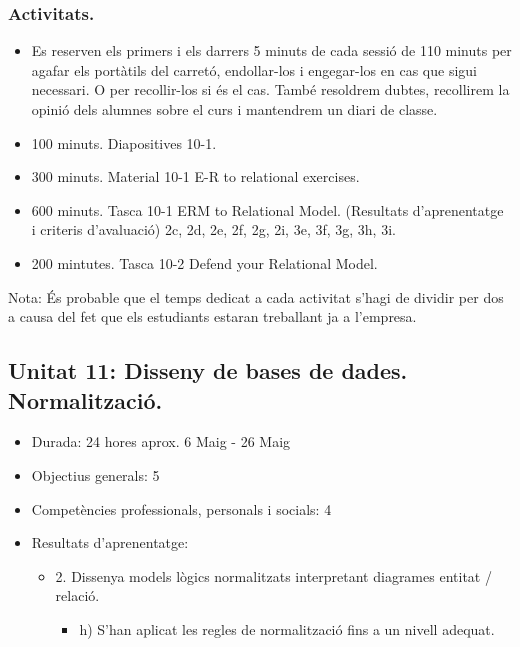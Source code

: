 \documentclass[catalan, a4paper, 12pt, titlepage]{article}
\begin{document}
  \subsubsection{Activitats.}
  \begin{itemize}
          \item Es reserven els primers i els darrers 5 minuts de cada sessió de 110 minuts per agafar els portàtils del carretó, endollar-los i engegar-los en cas que sigui necessari. O per recollir-los si és el cas. També resoldrem dubtes, recollirem la opinió dels alumnes sobre el curs i mantendrem un diari de classe.
	  \item 100 minuts. Diapositives 10-1.
	  \item 300 minuts. Material 10-1 E-R to relational exercises.
	  \item 600 minuts. Tasca 10-1 ERM to Relational Model. (\faGraduationCap Resultats d'aprenentatge i criteris d'avaluació) 2c, 2d, 2e, 2f, 2g, 2i, 3e, 3f, 3g, 3h, 3i.
	  \item 200 mintutes. Tasca 10-2 Defend your Relational Model.
  \end{itemize}

  Nota: És probable que el temps dedicat a cada activitat s'hagi de dividir per dos a causa del fet que els estudiants estaran treballant ja a l'empresa.

  \subsection{Unitat 11: Disseny de bases de dades. Normalització.}

  \begin{itemize}
	\item Durada: 24 hores aprox. 6 Maig - 26 Maig
	\item Objectius generals: 5
	\item Competències professionals, personals i socials: 4
	\item Resultats d'aprenentatge: 
		\begin{itemize}
			\item 2. Dissenya models lògics normalitzats interpretant diagrames entitat / relació.
				\begin{itemize}
					\item h) S'han aplicat les regles de normalització fins a un nivell adequat.
				\end{itemize}
		\end{itemize}
  \end{itemize}
\end{document}

